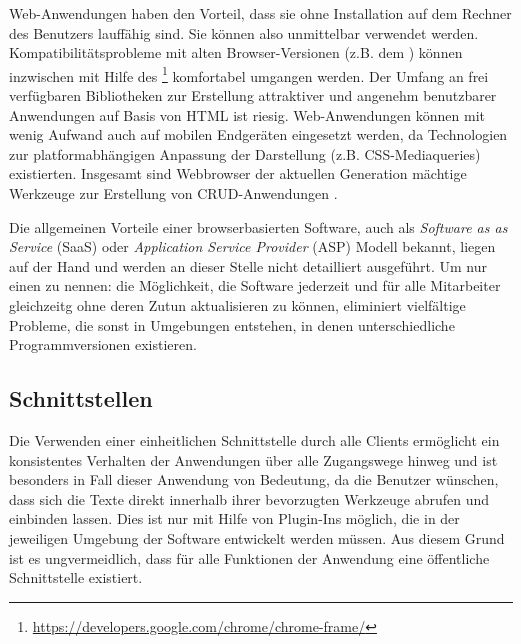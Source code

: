 Web-Anwendungen haben den Vorteil, dass sie ohne Installation auf dem Rechner des Benutzers lauffähig sind. Sie können also unmittelbar verwendet werden. Kompatibilitätsprobleme mit alten Browser-Versionen (z.B. dem ) können inzwischen mit Hilfe des \footnote{\url{https://developers.google.com/chrome/chrome-frame/}} komfortabel umgangen werden. Der Umfang an frei verfügbaren Bibliotheken zur Erstellung attraktiver und angenehm benutzbarer Anwendungen auf Basis von HTML ist riesig. Web-Anwendungen können mit wenig Aufwand auch auf mobilen Endgeräten eingesetzt werden, da Technologien zur platformabhängigen Anpassung der Darstellung (z.B. CSS-Mediaqueries) existierten. Insgesamt sind Webbrowser der aktuellen Generation mächtige Werkzeuge zur Erstellung von CRUD-Anwendungen \cite{ms-key-software-development-trends} .


Die allgemeinen Vorteile einer browserbasierten Software, auch als \emph{Software as as Service} (SaaS) oder \emph{Application Service Provider} (ASP) Modell bekannt, liegen auf der Hand und werden an dieser Stelle nicht detailliert ausgeführt. Um nur einen zu nennen: die Möglichkeit, die Software jederzeit und für alle Mitarbeiter gleichzeitg ohne deren Zutun aktualisieren zu können, eliminiert vielfältige Probleme, die sonst in Umgebungen entstehen, in denen unterschiedliche Programmversionen existieren.

\pagebreak

\subsection{Schnittstellen} 

Die Verwenden einer einheitlichen Schnittstelle durch alle Clients ermöglicht ein konsistentes Verhalten der Anwendungen über alle Zugangswege hinweg und ist besonders in Fall dieser Anwendung von Bedeutung, da die Benutzer wünschen, dass sich die Texte direkt innerhalb ihrer bevorzugten Werkzeuge abrufen und einbinden lassen. Dies ist nur mit Hilfe von Plugin-Ins möglich, die in der jeweiligen Umgebung der Software entwickelt werden müssen. Aus diesem Grund ist es ungvermeidlich, dass für alle Funktionen der Anwendung eine öffentliche Schnittstelle existiert.

